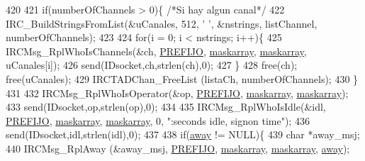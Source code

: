 \begin{DoxyCode}
{{{{{{420 
421                                 \textcolor{keywordflow}{if}(numberOfChannels > 0)\{ \textcolor{comment}{/*Si hay algun canal*/}
422                                         IRC\_BuildStringsFromList(&uCanales, 512, \textcolor{charliteral}{' '}, &nstrings, 
      listChannel, numberOfChannels);
423 
424                                         \textcolor{keywordflow}{for}(i = 0; i < nstrings; i++)\{
425                                                 IRCMsg\_RplWhoIsChannels(&ch, 
      \hyperlink{_g-2361-06-_p1-_server_8h_a78c658ff923693099f7b621e7c351129}{PREFIJO}, \hyperlink{_g-2361-06-_p1-_server_8c_ad51a4303b7c769561b12bf04a68bc042}{maskarray}, \hyperlink{_g-2361-06-_p1-_server_8c_ad51a4303b7c769561b12bf04a68bc042}{maskarray}, uCanales[i]);
426                                                 send(IDsocket,ch,strlen(ch),0);
427                                         \}
428                                         free(ch); free(uCanales);
429                                         IRCTADChan\_FreeList (listaCh, numberOfChannels);
430                                 \}
431 
432                                 IRCMsg\_RplWhoIsOperator(&op, \hyperlink{_g-2361-06-_p1-_server_8h_a78c658ff923693099f7b621e7c351129}{PREFIJO}, 
      \hyperlink{_g-2361-06-_p1-_server_8c_ad51a4303b7c769561b12bf04a68bc042}{maskarray}, \hyperlink{_g-2361-06-_p1-_server_8c_ad51a4303b7c769561b12bf04a68bc042}{maskarray});
433                                 send(IDsocket,op,strlen(op),0);
434 
435                                 IRCMsg\_RplWhoIsIdle(&idl, \hyperlink{_g-2361-06-_p1-_server_8h_a78c658ff923693099f7b621e7c351129}{PREFIJO}, 
      \hyperlink{_g-2361-06-_p1-_server_8c_ad51a4303b7c769561b12bf04a68bc042}{maskarray}, \hyperlink{_g-2361-06-_p1-_server_8c_ad51a4303b7c769561b12bf04a68bc042}{maskarray}, 0, \textcolor{stringliteral}{":seconds idle, signon time"});
436                                 send(IDsocket,idl,strlen(idl),0);
437 
438                                 \textcolor{keywordflow}{if}(\hyperlink{_g-2361-06-_p1-_server_8c_adf86742e21384f58f8999d8317e6a370}{away} != NULL)\{
439                                         \textcolor{keywordtype}{char} *away\_msj;
440                                         IRCMsg\_RplAway (&away\_msj, \hyperlink{_g-2361-06-_p1-_server_8h_a78c658ff923693099f7b621e7c351129}{PREFIJO}, 
      \hyperlink{_g-2361-06-_p1-_server_8c_ad51a4303b7c769561b12bf04a68bc042}{maskarray}, \hyperlink{_g-2361-06-_p1-_server_8c_ad51a4303b7c769561b12bf04a68bc042}{maskarray}, \hyperlink{_g-2361-06-_p1-_server_8c_adf86742e21384f58f8999d8317e6a370}{away});
}}}}}}
\end{DoxyCode}
